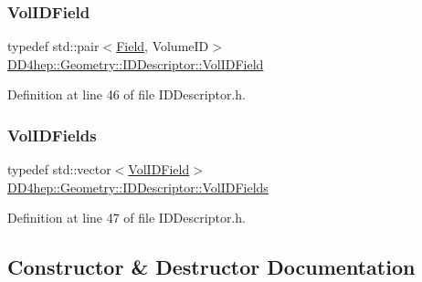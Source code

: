 \subsubsection{\texorpdfstring{Vol\+I\+D\+Field}{VolIDField}}
{\footnotesize\ttfamily typedef std\+::pair$<$\hyperlink{class_d_d4hep_1_1_geometry_1_1_i_d_descriptor_ac06f5915e74f8a8f2ff73e9a322556e4}{Field}, Volume\+ID$>$ \hyperlink{class_d_d4hep_1_1_geometry_1_1_i_d_descriptor_a29eabc3d9c0c0cfdc01c18e915114a71}{D\+D4hep\+::\+Geometry\+::\+I\+D\+Descriptor\+::\+Vol\+I\+D\+Field}}



Definition at line 46 of file I\+D\+Descriptor.\+h.

\hypertarget{class_d_d4hep_1_1_geometry_1_1_i_d_descriptor_a6c4700a96f3a202eedaa25e54d5695ff}{}\label{class_d_d4hep_1_1_geometry_1_1_i_d_descriptor_a6c4700a96f3a202eedaa25e54d5695ff} 
\subsubsection{\texorpdfstring{Vol\+I\+D\+Fields}{VolIDFields}}
{\footnotesize\ttfamily typedef std\+::vector$<$\hyperlink{class_d_d4hep_1_1_geometry_1_1_i_d_descriptor_a29eabc3d9c0c0cfdc01c18e915114a71}{Vol\+I\+D\+Field}$>$ \hyperlink{class_d_d4hep_1_1_geometry_1_1_i_d_descriptor_a6c4700a96f3a202eedaa25e54d5695ff}{D\+D4hep\+::\+Geometry\+::\+I\+D\+Descriptor\+::\+Vol\+I\+D\+Fields}}



Definition at line 47 of file I\+D\+Descriptor.\+h.



\subsection{Constructor \& Destructor Documentation}
\hypertarget{class_d_d4hep_1_1_geometry_1_1_i_d_descriptor_a967c8ac32de2bb90e1f94ecabe20828f}{}\label{class_d_d4hep_1_1_geometry_1_1_i_d_descriptor_a967c8ac32de2bb90e1f94ecabe20828f} 
